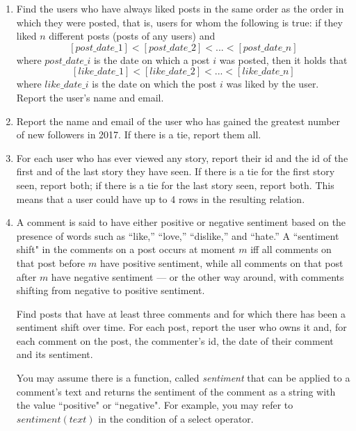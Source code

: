 \documentclass{article}
\begin{document}
\begin{enumerate}
\item   %
Find the users who have always liked posts
in the same order as the order in which they were posted,
that is,
users for whom the following is true:
if they liked $n$ different posts (posts of any users)
and
$$[post\_date\_1] < [post\_date\_2] < ... < [post\_date\_n]$$
where $post\_date\_i$ is the date on which a post $i$ was posted, 
then it holds that
$$[like\_date\_1] < [like\_date\_2] < ... < [like\_date\_n]$$ 
where $like\_date\_i$ is the date on which the post $i$ was liked 
by the user.  
Report the user's name and email.

\item   %
Report the name and email of the user
who has gained the greatest number of new followers in 2017. 
If there is a tie, report them all.

\item   %
For each user who has ever viewed any story, 
	report their id and the id of the first and of the last story they have seen.
If there is a tie for the first story seen, report both;
if there is a tie for the last story seen, report both.
This means that a user could have up to 4 rows in the resulting relation.

\item   %
A comment is said to have either positive or negative sentiment
based on the presence of words such as ``like,'' ``love,'' ``dislike,'' and ``hate.'' 
A ``sentiment shift" in the comments on a post occurs at moment $m$ iff
all comments on that post before $m$ have positive sentiment, 
while all comments on that post after $m$ have negative sentiment ---
or the other way around, with comments shifting from negative to positive sentiment.

Find posts that have at least three comments and for which there has been a sentiment shift over time. 
For each post, report the user who owns it and,
for each comment on the post,
the commenter's id, 
the date of their comment and its sentiment.

You may assume there is a function, called {\it sentiment}
that can be applied to a comment's text and 
returns the sentiment of the comment as a string with the value ``positive" or ``negative".
For example,
you may refer to $sentiment(text)$ in the condition of a select operator.

\end{enumerate}



\end{document}
